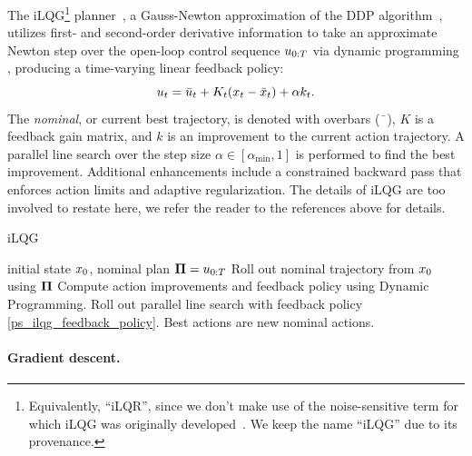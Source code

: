 The iLQG\footnote{Equivalently, ``iLQR'', since we don't make use of the noise-sensitive term for which iLQG was originally developed~\cite{li2004iterative}. We keep the name ``iLQG'' due to its provenance.} planner~\cite{tassa2012synthesis}, a Gauss-Newton approximation of the DDP algorithm~\cite{jacobson1970differential}, utilizes first- and second-order derivative information to take an approximate Newton step over the open-loop control sequence ${u}_{0:T}$ via dynamic programming \cite{kalman1964lqr}, producing a time-varying linear feedback policy:
\begin{equation}
	{u}_t = \bar{{u}}_t + K_t ({x}_t - \bar{{x}}_t) + \alpha k_t \label{ps_ilqg_feedback_policy}.
\end{equation}
The \emph{nominal}, or current best trajectory, is denoted with overbars ($\bar{\phantom{x}}$), $K$ is a feedback gain matrix, and $k$ is an improvement to the current action trajectory. A parallel line search over the step size $\alpha \in [\alpha_{\textrm{min}}, 1]$ is performed to find the best improvement. Additional enhancements include a constrained backward pass \cite{tassa2014control} that enforces action limits and adaptive regularization. The details of iLQG are too involved to restate here, we refer the reader to the references above for details.

\begin{algorithm}[H]
	\caption{iLQG}\label{ps_ilqg_algorithm}
	\begin{algorithmic}[1]
		\Require initial state ${x}_0$, nominal plan ${\mathbf{\Pi}}={u}_{0:T}$
		\State Roll out nominal trajectory from ${x}_0$ using ${\mathbf{\Pi}}$
		\State Compute action improvements and feedback policy using Dynamic Programming.
		\State Roll out parallel line search with feedback policy \eqref{ps_ilqg_feedback_policy}.
		\State Best actions are new nominal actions.
	\end{algorithmic}
\end{algorithm}

\paragraph{Gradient descent.}

